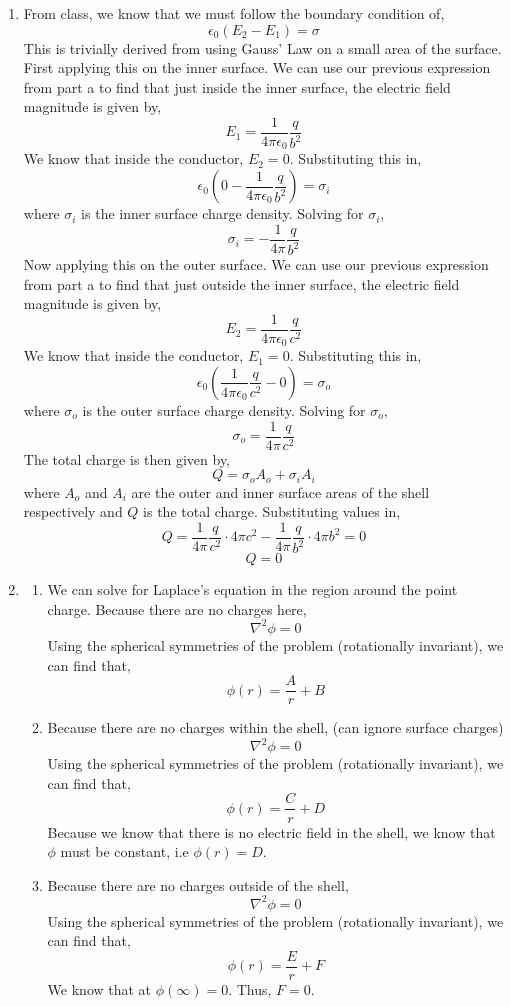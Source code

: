 \documentclass[12pt]{article}
\begin{document}
\begin{enumerate}
\begin{enumerate}
		\item [b.]
		From class, we know that we must follow the boundary condition of,
		\[\epsilon_0(E_2-E_1)=\sigma\]
		This is trivially derived from using Gauss' Law on a small area of the surface.
		First applying this on the inner surface.
		We can use our previous expression from part a to find that just inside the inner surface, the electric field magnitude is given by,
		\[E_1 = \frac{1}{4\pi \epsilon_0}\frac{q}{b^2}\]
		We know that inside the conductor, $E_2=0$.
		Substituting this in,
		\[\epsilon_0\left(0-\frac{1}{4\pi \epsilon_0}\frac{q}{b^2}\right)=\sigma_i\]
		where $\sigma_i$ is the inner surface charge density.
		Solving for $\sigma_i$,
		\[\boxed{\sigma_i = -\frac{1}{4\pi}\frac{q}{b^2}}\]
		Now applying this on the outer surface.
		We can use our previous expression from part a to find that just outside the inner surface, the electric field magnitude is given by,
		\[E_2 = \frac{1}{4\pi\epsilon_0}\frac{q}{c^2}\]
		We know that inside the conductor, $E_1=0$.
		Substituting this in,
		\[\epsilon_0\left(\frac{1}{4\pi\epsilon_0}\frac{q}{c^2}-0\right)=\sigma_o\]
		where $\sigma_o$ is the outer surface charge density.
		Solving for $\sigma_o$,
		\[\boxed{\sigma_o = \frac{1}{4\pi}\frac{q}{c^2}}\]
		The total charge is then given by,
		\[Q = \sigma_oA_o+\sigma_iA_i\]
		where $A_o$ and $A_i$ are the outer and inner surface areas of the shell respectively and $Q$ is the total charge.
		Substituting values in,
		\[Q=\frac{1}{4\pi}\frac{q}{c^2}\cdot 4\pi c^2 - \frac{1}{4\pi}\frac{q}{b^2}\cdot 4\pi b^2=0\]
		\[\boxed{Q=0}\]

		\item [c.]
		\begin{enumerate}
			\item [i.]
			We can solve for Laplace's equation in the region around the point charge.
			Because there are no charges here,
			\[\nabla^2\phi = 0\]
			Using the spherical symmetries of the problem (rotationally invariant), we can find that,
			\[\phi(r) = \frac{A}{r}+ B\]

			\item [ii.]
			Because there are no charges within the shell, (can ignore surface charges)
			\[\nabla^2\phi = 0\]
			Using the spherical symmetries of the problem (rotationally invariant), we can find that,
			\[\phi(r) = \frac{C}{r}+ D\]
			Because we know that there is no electric field in the shell, we know that $\phi$ must be constant, i.e $\phi(r)=D$.

			\item [iii.]
			Because there are no charges outside of the shell, 
			\[\nabla^2\phi = 0\]
			Using the spherical symmetries of the problem (rotationally invariant), we can find that,
			\[\phi(r) = \frac{E}{r}+F\]
			We know that at $\phi(\infty)=0$.
			Thus, $F=0$.


\end{enumerate}
\end{enumerate}
\end{enumerate}
\end{document}
